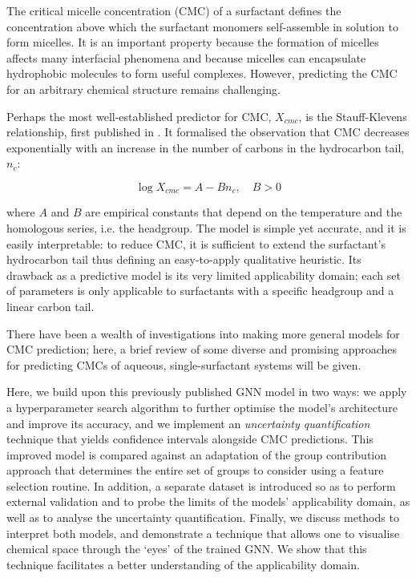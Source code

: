 The critical micelle concentration (CMC) of a surfactant defines the
concentration above which the surfactant monomers self-assemble in solution to
form micelles. It is an important property because the formation of micelles
affects many interfacial phenomena
\cite{rosenSurfactantsInterfacialPhenomena2012} and because micelles can
encapsulate hydrophobic molecules to form useful complexes. However, predicting
the CMC for an arbitrary chemical structure remains challenging.

Perhaps the most well-established predictor for CMC, $X_{cmc}$, is the Stauff-Klevens relationship, first published in \citeyear{klevensStructureAggregationDilate1953} \cite{klevensStructureAggregationDilate1953}. It formalised the observation that CMC decreases exponentially with an increase in the number of carbons in the hydrocarbon tail, $n_c$:

\begin{equation}
    \label{eq:klevens}
    \log X_{cmc} = A - Bn_c, \quad B > 0
\end{equation}

where $A$ and $B$ are empirical constants that depend on the temperature and the homologous series, i.e. the headgroup. The model is simple yet accurate, and it is easily interpretable: to reduce CMC, it is sufficient to extend the surfactant's hydrocarbon tail thus defining an easy-to-apply qualitative heuristic. Its drawback as a predictive model is its very limited applicability domain; each set of parameters is only applicable to surfactants with a specific headgroup and a linear carbon tail.

There have been a wealth of investigations into making more general models for
CMC prediction; here, a brief review of some diverse and promising approaches
for predicting CMCs of aqueous, single-surfactant systems will be given.



Here, we build upon this previously published GNN model in two ways: we apply a
hyperparameter search algorithm to further optimise the model's architecture and
improve its accuracy, and we implement an \emph{uncertainty quantification}
technique that yields confidence intervals alongside CMC predictions. This
improved model is compared against an adaptation of the group contribution
approach that determines the entire set of groups to consider using a feature
selection routine. In addition, a separate dataset is introduced so as to
perform external validation and to probe the limits of the models' applicability
domain, as well as to analyse the uncertainty quantification. Finally, we
discuss methods to interpret both models, and demonstrate a technique that
allows one to visualise chemical space through the `eyes' of the trained GNN. We
show that this technique facilitates a better understanding of the applicability
domain.